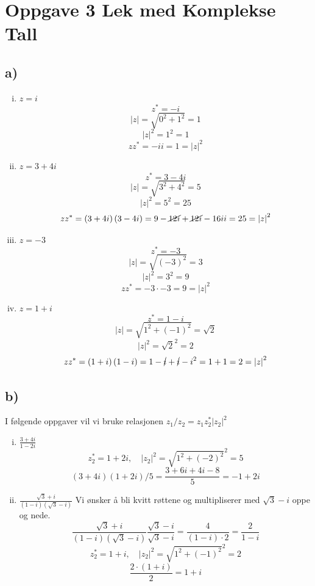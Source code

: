 \documentclass{article}
\begin{document}
\section*{Oppgave 3 Lek med Komplekse Tall}
\subsection*{a)}
\begin{enumerate}[(i)]
    \item $z = i$
    \[
    z^{*} = - i 
    \]
    \[
    \left| z \right|  = \sqrt{0^2 + 1^2} = 1 
    \]
    \[
    \left| z \right| ^{2} = 1^{2} = 1
    \] 
    \[
    zz^{*}  = -ii = 1 = \left| z \right|^{2}
    \]
    \item $z = 3 + 4i$ 
    \[
    z^{*} = 3 - 4i 
    \] 
    \[
    \left| z \right| = \sqrt{3^2 + 4^2} = 5 
    \]
    \[
    \left| z \right| ^{2} = 5^{2} = 25
    \] 
    \[
    zz^{*} = \left( 3 + 4i  \right) \left( 3 - 4i \right) = 9 - \cancel{12i} + \cancel{12i} - 16ii = 25 = \left| z \right| ^{2}
    \]
    \item $z = -3$
    \[
    z^{*} = -3
    \]
    \[
    \left| z \right| = \sqrt{\left( -3 \right) ^{2}} = 3
    \]
    \[
    \left| z \right| ^{2} = 3^{2} = 9
    \]
    \[
    zz^{*} = -3 ⋅ -3 = 9 = \left| z \right| ^{2}
    \]
    \item $z = 1 + i$
    \[
    z^{*} = 1 - i 
    \]
    \[
    \left| z \right| = \sqrt{1^2 + (-1)^2} = \sqrt{2}
    \]
    \[
    \left| z \right| ^{2} = \sqrt{2}^{2} = 2
    \]
    \[
    zz^{*} = \left( 1 + i \right) \left( 1 - i \right) = 1 - \cancel{i} + \cancel{i} - i^{2} = 1 + 1 = 2 = \left| z \right| ^{2}
    \]
\end{enumerate}

\subsection*{b)}
I følgende oppgaver vil vi bruke relasjonen $z_1 / z_2 = z_1 z_2 ^{*} \left| z_2 \right| ^{2}$
\begin{enumerate}[(i)]
    \item $\frac{3 + 4i}{1 - 2i}$
    \[
    z_2^{*} = 1 + 2i, \quad \left| z_2 \right| ^{2} = \sqrt{1^2 + (-2)^2}^{2} = 5
    \]
    \[
    \left( 3 + 4i \right) \left( 1 + 2i  \right) / 5 = \frac{3 + 6i + 4i - 8}{5} = -1 + 2 i
    \]
    \item $\frac{\sqrt{3} + i}{(1 - i)(\sqrt{3}-i)}$
    Vi ønsker å bli kvitt røttene og multipliserer med $\sqrt{3} - i$ oppe og nede. 
    \[
    \frac{\sqrt{3} + i}{(1 - i)(\sqrt{3}-i)} \frac{\sqrt{3}- i}{\sqrt{3}-i} = \frac{4}{(1-i) ⋅ 2} = \frac{2}{1 - i}
    \]
    \[
    z_2^{*} = 1 + i,  \quad \left| z_2 \right| ^{2} = \sqrt{1^2 + (-1)^2}^{2} = 2
    \]
    \[
    \frac{2 ⋅ \left( 1 + i \right)}{2} = 1 + i
    \]
\end{enumerate}
 
\end{document}
